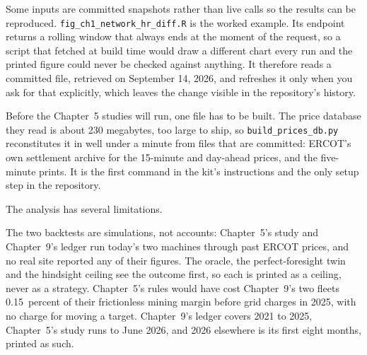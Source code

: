 Some inputs are committed snapshots rather than live calls so the results can be reproduced. \texttt{fig\_ch1\_network\_hr\_diff.R} is the
worked example. Its endpoint returns a rolling window that always ends at the
moment of the request, so a script that fetched at build time would draw a
different chart every run and the printed figure could never be checked against
anything. It therefore reads a committed file, retrieved on September 14, 2026,
and refreshes it only when you ask for that explicitly, which leaves the change
visible in the repository's history. %

Before the Chapter~5 studies will run, one file has to be built. The price
database they read is about 230 megabytes, too large to ship, so
\texttt{build\_prices\_db.py} reconstitutes it in well under a minute from
files that are committed: ERCOT's own settlement archive for the 15-minute
and day-ahead prices, and the five-minute prints. It is the first command in
the kit's instructions and the only setup step in the repository. %

The analysis has several limitations.

The two backtests are simulations, not accounts: Chapter~5's study and
Chapter~9's ledger run today's two machines through past ERCOT prices, and no
real site reported any of their figures. The oracle, the perfect-foresight twin
and the hindsight ceiling see the outcome first, so each is
printed as a ceiling, never as a strategy. Chapter~5's rules would have cost
Chapter~9's two fleets 0.15~percent of their frictionless mining margin before grid charges in
2025, with no charge for moving a target. Chapter~9's ledger covers 2021 to
2025, Chapter~5's study runs to June 2026, and 2026 elsewhere is its first
eight months, printed as such. %

